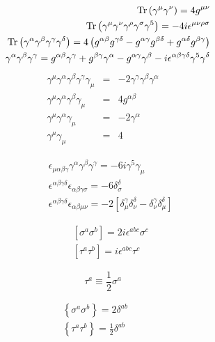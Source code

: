 \documentclass[14pt]{article}
\begin{document}
\vspace{1.0cm}
\parbox{8.0cm}{
\begin{eqnarray*}
 && {\rm Tr} \left (\gamma^\mu \gamma^\nu \right)  = 4 g^{\mu\nu} \\
 && {\rm Tr} \left (\gamma^\mu \gamma^\nu \gamma^\rho \gamma^\sigma 
		   \gamma^5 \right) = - 4 i \epsilon^{\mu\nu\rho\sigma} \\
 && {\rm Tr} \left (\gamma^\alpha \gamma^\beta \gamma^\gamma \gamma^\delta
		\right) =
	4\left(g^{\alpha\beta}g^{\gamma\delta} -
		g^{\alpha\gamma}g^{\beta\delta} +
                g^{\alpha\delta}g^{\beta\gamma}\right) \\
 &&  \gamma^\alpha \gamma^\beta \gamma^\gamma = 
	g^{\alpha\beta}\gamma^\gamma + g^{\beta\gamma}\gamma^\alpha -
	g^{\alpha\gamma}\gamma^\beta - 
	i \epsilon^{\alpha\beta\gamma\delta} \gamma^5\gamma^\delta
\end{eqnarray*}
\begin{eqnarray*}
  \gamma^\mu \gamma^\alpha \gamma^\beta \gamma^\gamma \gamma_\mu & = &
	-2 \gamma^\gamma \gamma^\beta \gamma^\alpha \\
  \gamma^\mu \gamma^\alpha \gamma^\beta \gamma_\mu & = &
	4 g^{\alpha\beta} \\
  \gamma^\mu \gamma^\alpha \gamma_\mu & = &
	- 2 \gamma^\alpha \\
  \gamma^\mu \gamma_\mu & = & 4
\end{eqnarray*}
}
\parbox[b]{5.0cm}
{
\begin{eqnarray*}
&& \epsilon_{\mu\alpha\beta\gamma} \gamma^\alpha \gamma^\beta \gamma^\gamma =
		- 6 i \gamma^5 \gamma_\mu \\
&& \epsilon^{\alpha\beta\gamma\delta}\epsilon_{\alpha\beta\gamma\sigma} =
	 -6 \delta^\delta_\sigma \\
&& \epsilon^{\alpha\beta\gamma\delta}\epsilon_{\alpha\beta\mu\nu} = 
	 -2 \left [ \delta_\mu^\gamma \delta_\nu^\delta - 
		    \delta_\nu^\gamma \delta_\mu^\delta \right ] 
\end{eqnarray*}
}

\parbox{5.0cm}
{
\begin{eqnarray*}
&&	\left[ \sigma^a \sigma^b \right] = 2 i \epsilon^{abc} \sigma^c \\
&&	\left[ \tau^a \tau^b \right] = i \epsilon^{abc} \tau^c 
\end{eqnarray*}
}
\parbox{5.0cm}
{
\begin{equation*}
	\tau^a \equiv \frac{1}{2} \sigma^a
\end{equation*}
}
\parbox{5.0cm}
{
\begin{eqnarray*}
	\left\{ \sigma^a \sigma^b \right\} = 2 \delta^{ab} &&\\
	\left\{ \tau^a \tau^b \right\} = \frac{1}{2} \delta^{ab} &&
\end{eqnarray*}
}
\end{document}
